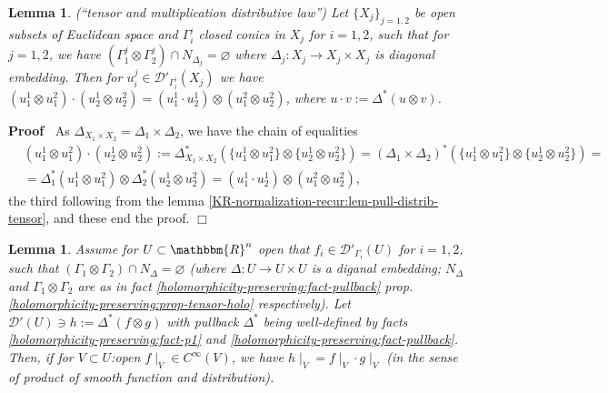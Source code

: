 \documentclass{article}
\newcommand{\assign}{:=}
\renewenvironment{proof}{\noindent\textbf{Proof\ }}{\hspace*{\fill}$\Box$\medskip}
\newtheorem{lemma}[proposition]{Lemma}
\theoremstyle{remark}
\begin{document}
\begin{lemma}
  \label{KR-normalization-recur:lem-mult-distrib-tensor}(``tensor and
  multiplication distributive law'') Let $\{ X_j \}_{j = 1, 2}$ be open
  subsets of Euclidean space and $\Gamma_i^{_j}$ closed conics in $X_j$ for $i
  = 1, 2$, such that for $j = 1, 2$, we have $(\Gamma_1^j \otimes \Gamma_2^j)
  \cap N_{\Delta_j} = \varnothing$ where $\Delta_j : X_j \rightarrow X_j
  \times X_j$ is diagonal embedding. Then for $u_i^j \in
  \mathcal{D}'_{\Gamma^{_j}_i} (X_j)$ we have $(u_1^1 \otimes u_1^2) \cdot
  (u_2^1 \otimes u_2^2) = (u_1^1 \cdot u_2^1) \otimes (u_1^2 \otimes u_2^2)$,
  where $u \cdot v \assign \Delta^{\ast} (u \otimes v)$.
\end{lemma}

\begin{proof}
  As $\Delta_{X_1 \times X_2} = \Delta_1 \times \Delta_2$, we have the chain
  of equalities
  \begin{eqnarray}
    & (u_1^1 \otimes u_1^2) \cdot (u_2^1 \otimes u_2^2) \assign \Delta_{X_1
    \times X_2}^{\ast} (\{ u_1^1 \otimes u_1^2 \} \otimes \{ u_2^1 \otimes
    u_2^2 \}) = (\Delta_1^{} \times \Delta_2)^{\ast} (\{ u_1^1 \otimes u_1^2
    \} \otimes \{ u_2^1 \otimes u_2^2 \}) = &  \nonumber\\
    & = \Delta_1^{\ast} (u_1^1 \otimes u_1^2) \otimes \Delta_2^{\ast} (u_2^1
    \otimes u_2^2) = (u_1^1 \cdot u_2^1) \otimes (u_1^2 \otimes u_2^2), & 
    \nonumber
  \end{eqnarray}
  the third following from the lemma
  \ref{KR-normalization-recur:lem-pull-distrib-tensor}, and these end the
  proof.
\end{proof}

\begin{lemma}
  \label{KR-normalization-recur:lem-mult-smth}Assume for $U \subset
  \mathbbm{R}^n$ open that $f_i \in \mathcal{D}'_{\Gamma_i} (U)$ for $i = 1,
  2$, such that $(\Gamma_1 \otimes \Gamma_2) \cap N_{\Delta} = \varnothing$
  (where $\Delta : U \rightarrow U \times U$ is a diganal embedding;
  $N_{\Delta}$ and $\Gamma_1 \otimes \Gamma_2$ are as in fact
  \ref{holomorphicity-preserving:fact-pullback} prop.
  \ref{holomorphicity-preserving:prop-tensor-holo} respectively). Let
  $\mathcal{D}' (U) \ni h \assign \Delta^{\ast} (f \otimes g)$ with pullback
  $\Delta^{\ast}$ being well-defined by facts
  \ref{holomorphicity-preserving:fact-p1} and
  \ref{holomorphicity-preserving:fact-pullback}. Then, if for $V \subset
  U$:open $f \mid_V \in C^{\infty} (V)$, we have $h \mid_V = f
  \mid_V \cdot g \mid_V$ (in the sense of product of smooth function
  and distribution).
\end{lemma}
\end{document}
